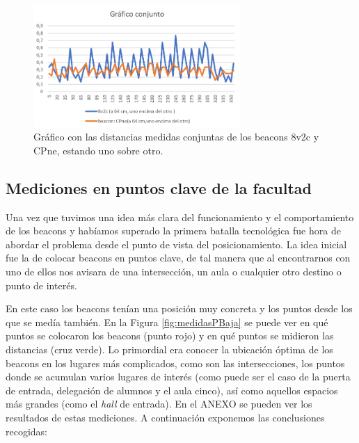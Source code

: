 \begin{figure}[t]
	\centering
	\includegraphics[width=0.7\textwidth]{Imagenes/Descripciondeltrabajo/dist_conjunto}
	\caption{Gráfico con las distancias medidas conjuntas de los beacons 8v2c y CPne, estando uno sobre otro. }
	\label{fig:dist_conjunto}
\end{figure}


\subsection{Mediciones en puntos clave de la facultad}

Una vez que tuvimos una idea más clara del funcionamiento y el comportamiento de los beacons y habíamos superado la primera batalla tecnológica fue hora de abordar el problema desde el punto de vista del posicionamiento. La idea inicial fue la de colocar beacons en puntos clave, de tal manera que al encontrarnos con uno de ellos nos avisara de una intersección, un aula o cualquier otro destino o punto de interés. 

En este caso los beacons tenían una posición muy concreta y los puntos desde los que se medía también. En la Figura \ref{fig:medidasPBaja} se puede ver en qué puntos se colocaron los beacons (punto rojo) y en qué puntos se midieron las distancias (cruz verde). Lo primordial era conocer la ubicación óptima de los beacons en los lugares más complicados, como son las intersecciones, los puntos donde se acumulan varios lugares de interés (como puede ser el caso de la puerta de entrada, delegación de alumnos y el aula cinco), así como aquellos espacios más grandes (como el \textit{hall} de entrada). En el ANEXO se pueden ver los resultados de estas mediciones. A continuación exponemos las conclusiones recogidas:

